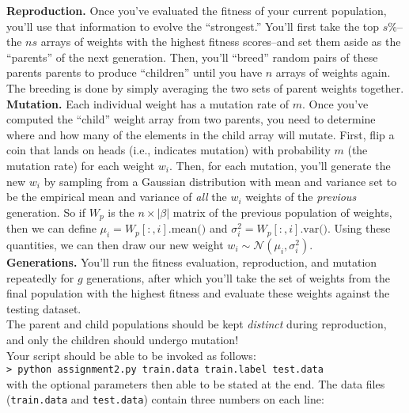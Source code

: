 \documentclass[paper=a4, fontsize=11pt]{scrartcl} %
\numberwithin{figure}{section} %
\numberwithin{table}{section} %
\begin{document}
\textbf{Reproduction.} Once you've evaluated the fitness of your current population, you'll use that information to evolve the ``strongest.'' You'll first take the top $s\%$--the $ns$ arrays of weights with the highest fitness scores--and set them aside as the ``parents'' of the next generation. Then, you'll ``breed'' random pairs of these parents parents to produce ``children'' until you have $n$ arrays of weights again. The breeding is done by simply averaging the two sets of parent weights together. \\

\textbf{Mutation.} Each individual weight has a mutation rate of $m$. Once you've computed the ``child'' weight array from two parents, you need to determine where and how many of the elements in the child array will mutate. First, flip a coin that lands on heads (i.e., indicates mutation) with probability $m$ (the mutation rate) for each weight $w_i$. Then, for each mutation, you'll generate the new $w_i$ by sampling from a Gaussian distribution with mean and variance set to be the empirical mean and variance of \emph{all} the $w_i$ weights of the \emph{previous} generation. So if $W_{p}$ is the $n \times |\beta|$ matrix of the previous population of weights, then we can define $\mu_i = W_p\left[:, i\right]\textrm{.mean()}$ and $\sigma_i^2 = W_p\left[:, i\right]\textrm{.var()}$. Using these quantities, we can then draw our new weight $w_i \sim \mathcal{N}(\mu_i, \sigma_i^2)$. \\

\textbf{Generations.} You'll run the fitness evaluation, reproduction, and mutation repeatedly for $g$ generations, after which you'll take the set of weights from the final population with the highest fitness and evaluate these weights against the testing dataset. \\

The parent and child populations should be kept \emph{distinct} during reproduction, and only the children should undergo mutation! \\

Your script should be able to be invoked as follows: \\

\texttt{> python assignment2.py train.data train.label test.data} \\

with the optional parameters then able to be stated at the end. The data files (\texttt{train.data} and \texttt{test.data}) contain three numbers on each line: \\
\end{document}

